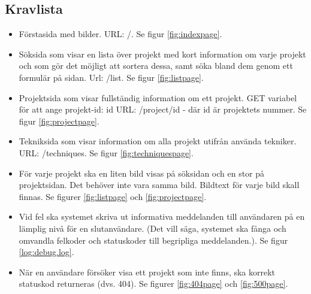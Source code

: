 \documentclass{TDP003mall}
\begin{document}
\subsection{Kravlista}
\begin{itemize}
    \item Förstasida med bilder. URL: /. Se figur \ref{fig:indexpage}.
    \item Söksida som visar en lista över projekt med kort information om varje projekt och som gör det möjligt att sortera dessa, samt söka bland dem genom ett formulär på sidan. Url: /list. Se figur \ref{fig:listpage}.
    \item Projektsida som visar fullständig information om ett projekt. GET variabel för att ange projekt-id: id URL: /project/id - där id är projektets nummer. Se figur \ref{fig:projectpage}.
    \item Tekniksida som visar information om alla projekt utifrån använda tekniker. URL: /techniques. Se figur \ref{fig:techniquespage}.
    \item För varje projekt ska en liten bild visas på söksidan och en stor på projektsidan. Det behöver inte vara samma bild. Bildtext för varje bild skall finnas. Se figurer \ref{fig:listpage} och \ref{fig:projectpage}.
    \item Vid fel ska systemet skriva ut informativa meddelanden till användaren på en lämplig nivå för en slutanvändare. (Det vill säga, systemet ska fånga och omvandla felkoder och statuskoder till begripliga meddelanden.). Se figur \ref{log:debug.log}.
    \item När en användare försöker visa ett projekt som inte finns, ska korrekt statuskod returneras (dvs. 404). Se figurer \ref{fig:404page} och \ref{fig:500page}.
\end{itemize}
\end{document}
